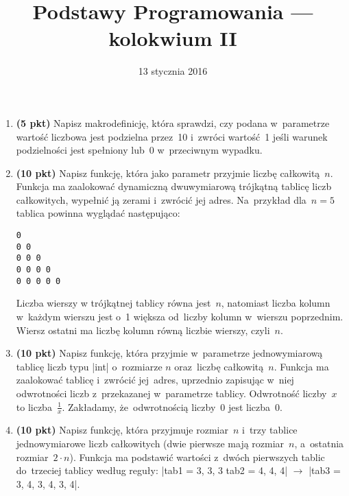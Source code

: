 \documentclass[extrafontsizes,10pt]{article}
\title{Podstawy Programowania --- kolokwium II}
\date{13 stycznia 2016}
\begin{document}
\maketitle
\DefineShortVerb{\|}
\thispagestyle{empty}

\begin{enumerate}
\itemsep1em

\item \textbf{(5 pkt)}
Napisz makrodefinicję, która sprawdzi,
czy podana w~parametrze wartość liczbowa
jest podzielna przez~10
i~zwróci wartość~1 jeśli warunek podzielności jest spełniony
lub~0 w~przeciwnym wypadku.

\item \textbf{(10 pkt)}
Napisz funkcję, która jako parametr przyjmie liczbę całkowitą~$n$.
Funkcja ma zaalokować dynamiczną dwuwymiarową trójkątną tablicę liczb całkowitych,
wypełnić ją zerami i~zwrócić jej adres.
Na~przykład dla~$n = 5$ tablica powinna wyglądać następująco:
\begin{center}
\begin{BVerbatim}
0
0 0
0 0 0
0 0 0 0
0 0 0 0 0
\end{BVerbatim}
\end{center}
Liczba wierszy w trójkątnej tablicy równa jest~$n$,
natomiast liczba kolumn w~każdym wierszu jest o~1
większa od~liczby kolumn w~wierszu poprzednim.
Wiersz ostatni ma liczbę kolumn równą liczbie wierszy, czyli~$n$.

\item \textbf{(10 pkt)}
Napisz funkcję, która przyjmie w~parametrze jednowymiarową tablicę
liczb typu |int| o~rozmiarze $n$ oraz~liczbę całkowitą~$n$.
Funkcja ma zaalokować tablicę i~zwrócić jej~adres,
uprzednio zapisując w~niej odwrotności liczb z~przekazanej
w~parametrze tablicy.
Odwrotność liczby~$x$ to liczba~$\frac{1}{x}$.
Zakładamy, że~odwrotnością liczby~0 jest liczba~0.

\item \textbf{(10 pkt)}
Napisz funkcję, która przyjmuje rozmiar~$n$
i~trzy tablice jednowymiarowe
liczb całkowitych
(dwie pierwsze mają rozmiar~$n$,
a~ostatnia rozmiar~$2\cdot n$).
Funkcja ma podstawić wartości
z~dwóch pierwszych tablic
do~trzeciej tablicy według reguły:
|tab1 = {3, 3, 3} tab2 = {4, 4, 4}| $\rightarrow$ |tab3 = {3, 4, 3, 4, 3, 4}|.


\end{enumerate}
\end{document}
